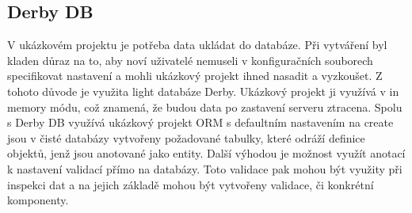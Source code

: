 \subsection{Derby DB}
V ukázkovém projektu je potřeba data ukládat do databáze. Při vytváření byl kladen důraz na to, aby noví uživatelé nemuseli v konfiguračních souborech specifikovat nastavení a mohli ukázkový projekt ihned nasadit a vyzkoušet. Z tohoto důvode je využita light databáze Derby. Ukázkový projekt ji využívá v in memory módu, což znamená, že budou data po zastavení serveru ztracena. Spolu s Derby DB využívá ukázkový projekt ORM s defaultním nastavením na create jsou v čisté databázy vytvořeny požadované tabulky, které odráží definice objektů, jenž jsou anotované jako entity. Další výhodou je možnost využít anotací k nastavení validací přímo na databázy. Toto validace pak mohou být využity při inspekci dat a na jejich základě mohou být vytvořeny validace, či konkrétní komponenty.
